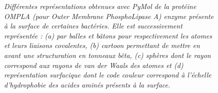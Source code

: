 \begin{figure}
\begin{subfigure}{.5\textwidth}
  \caption{}
    \label{Fig:surface_representation}
  \end{subfigure}%
  \caption[Différentes représentations informatiques de la protéine OMPLA par PyMol.]{\it Différentes représentations obtenues avec PyMol de la protéine OMPLA (pour \textit{Outer Membrane PhosphoLipase A}) enzyme présente à la surface de certaines bactéries. Elle est successivement représentée : (a) par balles et bâtons pour respectivement les atomes et leurs liaisons covalentes, (b) \textit{cartoon} permettant de mettre en avant une structuration en \textit{tonneaux bêta}, (c) sphères dont le rayon correspond aux rayons de van der Waals des atomes et (d) représentation surfacique dont le code couleur correspond à l'échelle d'hydrophobie des acides aminés présents à la surface.
  }
\end{figure}

